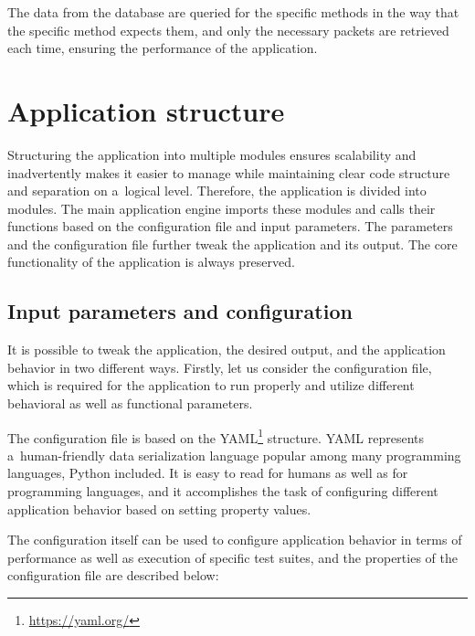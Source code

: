 \documentclass[
  printed,     %
  color,       %
  oneside,     %
  nosansbold,  %
  nocolorbold, %
  nolof,         %
  nolot,         %
]{fithesis4}
\begin{document}
The data from the database are queried for the specific methods in the way that the specific method expects them, and only the necessary packets are retrieved each time, ensuring the performance of the application.

\section{Application structure}

Structuring the application into multiple modules ensures scalability and inadvertently makes it easier to manage while maintaining clear code structure and separation on a~logical level. Therefore, the application is divided into modules. The main application engine imports these modules and calls their functions based on the configuration file and input parameters. The parameters and the configuration file further tweak the application and its output. The core functionality of the application is always preserved.

\subsection{Input parameters and configuration}
\label{sec:config}

It is possible to tweak the application, the desired output, and the application behavior in two different ways. Firstly, let us consider the configuration file, which is required for the application to run properly and utilize different behavioral as well as functional parameters.

The configuration file is based on the YAML\footnote{\url{https://yaml.org/}} structure. YAML represents a~human-friendly data serialization language popular among many programming languages, Python included. It is easy to read for humans as well as for programming languages, and it accomplishes the task of configuring different application behavior based on setting property values.

The configuration itself can be used to configure application behavior in terms of performance as well as execution of specific test suites, and the properties of the configuration file are described below:
\end{document}
